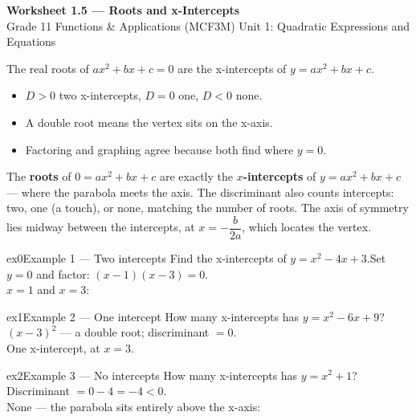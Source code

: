 \documentclass[11pt]{article}
\begin{document}
\begin{center}
{\LARGE\bfseries\color{titleblue}Worksheet 1.5 --- Roots and x-Intercepts}\\[2pt]
{\small Grade 11 Functions \& Applications (MCF3M) \textperiodcentered{} Unit 1: Quadratic Expressions and Equations}
\end{center}

\begin{ideabox}
The real roots of $ax^2+bx+c=0$ are the x-intercepts of $y=ax^2+bx+c$.
\begin{itemize}[leftmargin=*,itemsep=2pt]
  \item $D>0$ two x-intercepts, $D=0$ one, $D<0$ none.
  \item A double root means the vertex sits on the x-axis.
  \item Factoring and graphing agree because both find where $y=0$.
\end{itemize}
\end{ideabox}

\begin{learnbox}
The \textbf{roots} of $0=ax^2+bx+c$ are exactly the \textbf{$x$-intercepts} of $y=ax^2+bx+c$ — where the parabola meets the axis.
The discriminant also counts intercepts: two, one (a touch), or none, matching the number of roots.
The axis of symmetry lies midway between the intercepts, at $x=-\dfrac{b}{2a}$, which locates the vertex.
\end{learnbox}


\begin{example}{ex0}{Example 1 --- Two intercepts}
Find the x-intercepts of $y=x^2-4x+3$.\soln Set $y=0$ and factor: $(x-1)(x-3)=0$. \\ $x=1$ and $x=3$:
\end{example}

\begin{example}{ex1}{Example 2 --- One intercept}
How many x-intercepts has $y=x^2-6x+9$?\soln $(x-3)^2$ — a double root; discriminant $=0$. \\ One x-intercept, at $x=3$.
\end{example}

\begin{example}{ex2}{Example 3 --- No intercepts}
How many x-intercepts has $y=x^2+1$?\soln Discriminant $=0-4=-4<0$. \\ None — the parabola sits entirely above the x-axis:
\end{example}
\end{document}
